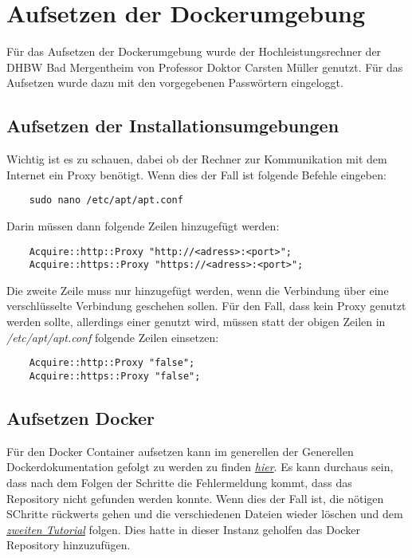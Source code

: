 \chapter{Aufsetzen der Dockerumgebung}
Für das Aufsetzen der Dockerumgebung wurde der Hochleistungsrechner der DHBW Bad Mergentheim von Professor Doktor Carsten Müller genutzt. Für das Aufsetzen wurde dazu mit den vorgegebenen Passwörtern eingeloggt. 
\section{Aufsetzen der Installationsumgebungen}
Wichtig ist es zu schauen, dabei ob der Rechner zur Kommunikation mit dem Internet ein Proxy benötigt. Wenn dies der Fall ist folgende Befehle eingeben:

\begin{verbatim}
    sudo nano /etc/apt/apt.conf
\end{verbatim}
Darin müssen dann folgende Zeilen hinzugefügt werden:
\begin{verbatim}
    Acquire::http::Proxy "http://<adress>:<port>";
    Acquire::https::Proxy "https://<adress>:<port>";
\end{verbatim}
Die zweite Zeile muss nur hinzugefügt werden, wenn die Verbindung über eine verschlüsselte Verbindung geschehen sollen. Für den Fall, dass kein Proxy genutzt werden sollte, allerdings einer genutzt wird, müssen statt der obigen Zeilen in \textit{/etc/apt/apt.conf} folgende Zeilen einsetzen:
\begin{verbatim}
    Acquire::http::Proxy "false";
    Acquire::https::Proxy "false";
\end{verbatim}

\section{Aufsetzen Docker}
Für den Docker Container aufsetzen kann im generellen der Generellen Dockerdokumentation gefolgt zu werden zu finden \textit{\href{https://docs.docker.com/desktop/install/ubuntu/}{hier}}. Es kann durchaus sein, dass nach dem Folgen der Schritte die Fehlermeldung kommt, dass das Repository nicht gefunden werden konnte. Wenn dies der Fall ist, die nötigen SChritte rückwerts gehen und die verschiedenen Dateien wieder löschen und dem \textit{\href{https://www.digitalocean.com/community/tutorials/how-to-install-and-use-docker-on-ubuntu-20-04}{zweiten Tutorial}} folgen. Dies hatte in dieser Instanz geholfen das Docker Repository hinzuzufügen.